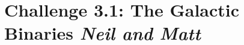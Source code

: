 \documentclass{iopart}
\begin{document}


\section{Challenge 3.1: The Galactic Binaries {\it Neil and Matt}}
\end{document}
